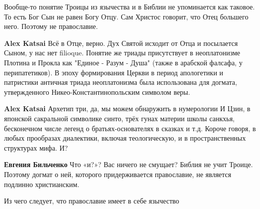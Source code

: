 \begin{itemize}
Вообще-то понятие Троицы из язычества и в Библии не упоминается как таковое. То
есть Бог Сын не равен Богу Отцу. Сам Христос говорит, что Отец большего него.
Поэтому не православие.

\begin{itemize}
 
\textbf{Alex Katsai} Всё в Отце, верно. Дух Святой исходит от Отца и посылается
Сыном, у нас нет filioque. Понятие же триады присутствует в неоплатонизме
Плотина и Прокла как "Единое - Разум - Душа" (также в арабской фалсафа, у
перипатетиков). В эпоху формирования Церкви в период апологетики и патристики
античная триада неоплатонизма была использована для догмата, утвержденного
Никео-Константинопольским символом веры.

 
\textbf{Alex Katsai} Архетип три, да, мы можем обнаружить в нумерологии И Цзин,
в японской сакральной символике синто, трёх гунах материи школы санкхья,
бесконечном числе легенд о братьях-основателях в сказках и т.д. Короче говоря,
в любых прообразах диалектики, включая теологическую, и в пространственных
структурах мифа. И?

 
\textbf{Евгения Бильченко} Что «и?»? Вас ничего не смущает? Библия не учит
Троице. Поэтому догмат о ней, которого придерживается православие, не является
подлинно христианским.

 
Из чего следует, что православие имеет в себе язычество


\end{itemize}
\end{itemize}
